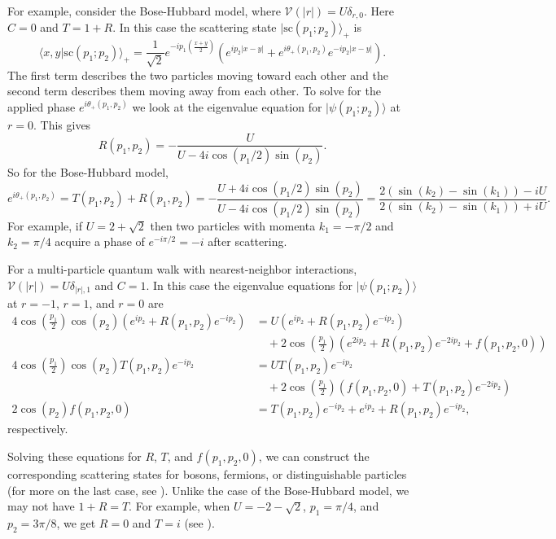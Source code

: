 \documentclass[../thesis-main/thesis-main]{subfiles}
\begin{document}
For example, consider the Bose-Hubbard model, where $\mathcal{V}(|r|) = U\delta_{r,0}$. Here $C=0$ and $T=1+R$.  In this case the scattering state $|\mathrm{sc}(p_1;p_2)\rangle_+$ is
\[
\langle x,y|\mathrm{sc}(p_1;p_2)\rangle_+=\frac{1}{\sqrt{2}}e^{-ip_1 \left(\frac{x+y}{2}\right)}\left(e^{ip_2 |x-y|}+e^{i\theta_+(p_1,p_2)}e^{-ip_2 |x-y|}\right).
\]
The first term describes the two particles moving toward each other and the second term describes them moving away from each other. To solve for the applied phase $e^{i\theta_+(p_1,p_2)}$ we look at the eigenvalue equation for $|\psi(p_1;p_2)\rangle$ at $r=0$. This gives
\[
  R(p_1,p_2) =- \frac{U}{U - 4i\cos({p_1}/{2})\sin(p_2)}.
\]
So for the Bose-Hubbard model,
\[
  e^{i \theta_{+} (p_1,p_2)} = T(p_1,p_2) + R(p_1,p_2) = - \frac{ U + 4 i \cos({p_1}/{2}) \sin(p_2)}{U - 4 i \cos({p_1}/{2}) \sin(p_2)} =  \frac{2 \left(\sin(k_2) - \sin(k_1)\right) - i U}{2 \left(\sin(k_2) - \sin(k_1)\right) + i U}.
\]
For example, if $U = 2+\sqrt{2}$ then two particles with momenta $k_1 =-{ \pi}/{2}$ and $k_2={\pi}/{4}$ acquire a phase of $e^{-i\pi/2}= -i$ after scattering.

For a multi-particle quantum walk with nearest-neighbor interactions, $\mathcal{V}(|r|)=U\delta_{|r|,1}$ and $C=1$.  In this case the eigenvalue equations for $|\psi(p_1;p_2)\rangle$ at $r=-1$, $r=1$, and $r=0$ are
\begin{align*}
 4 \cos\left(\frac{p_1}{2}\right)  \cos(p_2) ( e^{i p_2} + R(p_1,p_2) e^{-i p_2} ) &= U ( e^{i p_2} + R(p_1,p_2) e^{-i p_2}) \\
& \quad + 2\cos\left(\frac{p_1}{2}\right) \left( e^{2i p_2} + R(p_1,p_2) e^{-2i p_2}+f(p_1,p_2,0)\right) \\
 4 \cos\left(\frac{p_1}{2}\right)  \cos(p_2) T(p_1,p_2) e^{-ip_2} & =UT(p_1,p_2)e^{-ip_2}\\
& \quad +2\cos \left(\frac{p_1}{2}\right)\left(f(p_1,p_2,0)+T(p_1,p_2)e^{-2ip_2}\right)\\
2 \cos(p_2) f(p_1,p_2,0) &=T(p_1,p_2)e^{-ip_2}+e^{ip_2}+R(p_1,p_2)e^{-ip_2},
\end{align*}
respectively.

Solving these equations for $R$, $T$, and $f(p_1,p_2,0)$, we can construct the corresponding scattering states for bosons, fermions, or distinguishable particles (for more on the last case, see ). Unlike the case of the Bose-Hubbard model, we may not have $1+R=T$. For example, when $U=-2-\sqrt{2}$, $p_1={\pi}/{4}$, and $p_2={3\pi}/{8}$, we get $R=0$ and $T=i$ (see ).
\end{document}
